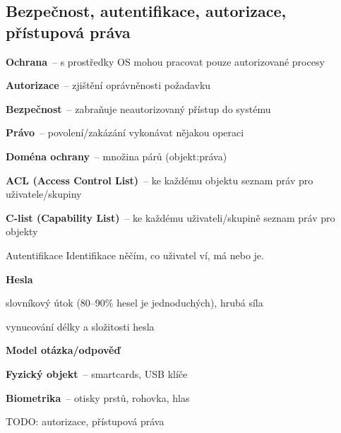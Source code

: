 \subsection{Bezpečnost, autentifikace, autorizace, přístupová práva}

\begin{definice}
  \begin{pitemize}
    \item \textbf{Ochrana}~-- s prostředky OS mohou pracovat pouze autorizované procesy
    \item \textbf{Autorizace}~-- zjištění oprávněnosti požadavku
    \item \textbf{Bezpečnost}~-- zabraňuje neautorizovaný přístup do systému
    \item \textbf{Právo}~-- povolení/zakázání vykonávat nějakou operaci
    \item \textbf{Doména ochrany}~-- množina párů (objekt:práva)
    \begin{pitemize}
      \item \textbf{ACL (Access Control List)}~-- ke každému objektu seznam práv pro uživatele/skupiny
      \item \textbf{C-list (Capability List)}~-- ke každému uživateli/skupině seznam práv pro objekty
    \end{pitemize}
  \end{pitemize}
\end{definice}

\begin{obecne}{Autentifikace}
  Identifikace něčím, co uživatel ví, má nebo je. 
  \begin{pitemize}
    \item \textbf{Hesla}
    \begin{pitemize}
      \item slovníkový útok (80--90\% hesel je jednoduchých), hrubá síla
      \item vynucování délky a složitosti hesla
    \end{pitemize}
    \item \textbf{Model otázka/odpověď}
    \item \textbf{Fyzický objekt}~-- smartcards, USB klíče
    \item \textbf{Biometrika}~-- otisky prstů, rohovka, hlas
  \end{pitemize}
\end{obecne}

TODO: autorizace, přístupová práva
